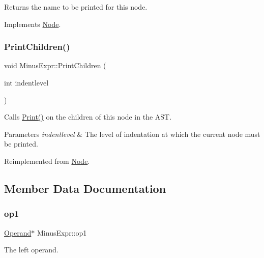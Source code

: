 Returns the name to be printed for this node. 

Implements \hyperlink{class_node_a56e29657306ffb004d69c6929ae44269}{Node}.

\mbox{\label{class_minus_expr_ad4dccbb9a497a866f41742f9db77ae99}} 
\subsubsection{\texorpdfstring{Print\+Children()}{PrintChildren()}}
{\footnotesize\ttfamily void Minus\+Expr\+::\+Print\+Children (\begin{DoxyParamCaption}\item[{int}]{indentlevel }\end{DoxyParamCaption})\hspace{0.3cm}{\ttfamily [virtual]}}

Calls \hyperlink{class_node_a9ef727fd72d1a37792b3db60a8a479dd}{Print()} on the children of this node in the A\+ST. 
\begin{DoxyParams}{Parameters}
{\em indentlevel} & The level of indentation at which the current node must be printed. \\
\hline
\end{DoxyParams}


Reimplemented from \hyperlink{class_node_a3e67ec8d22182b721717af14fe0c3000}{Node}.



\subsection{Member Data Documentation}
\mbox{\label{class_minus_expr_a757e5b2e7d8a593e3a62ed2b7caadbb4}} 
\subsubsection{\texorpdfstring{op1}{op1}}
{\footnotesize\ttfamily \hyperlink{class_operand}{Operand}$\ast$ Minus\+Expr\+::op1\hspace{0.3cm}{\ttfamily [protected]}}

The left operand. \mbox{\label{class_minus_expr_ae40bb3302e5fedad288bb78ea0975205}} 
